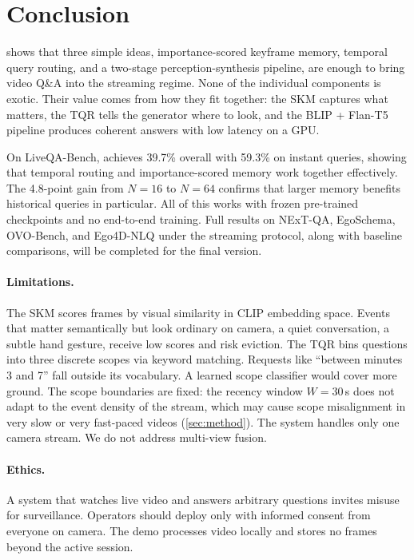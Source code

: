 \section{Conclusion}
\label{sec:conclusion}

\ours shows that three simple ideas, importance-scored keyframe memory, temporal query routing, and a two-stage perception-synthesis pipeline, are enough to bring video Q\&A into the streaming regime. None of the individual components is exotic. Their value comes from how they fit together: the SKM captures what matters, the TQR tells the generator where to look, and the BLIP + Flan-T5 pipeline produces coherent answers with low latency on a GPU.

On LiveQA-Bench, \ours achieves 39.7\% overall with 59.3\% on instant queries, showing that temporal routing and importance-scored memory work together effectively.
The 4.8-point gain from $N\!=\!16$ to $N\!=\!64$ confirms that larger memory benefits historical queries in particular.
All of this works with frozen pre-trained checkpoints and no end-to-end training.
Full results on NExT-QA, EgoSchema, OVO-Bench, and Ego4D-NLQ under the streaming protocol, along with baseline comparisons, will be completed for the final version.

\paragraph{Limitations.}
The SKM scores frames by visual similarity in CLIP embedding space. Events that matter semantically but look ordinary on camera, a quiet conversation, a subtle hand gesture, receive low scores and risk eviction.
The TQR bins questions into three discrete scopes via keyword matching. Requests like ``between minutes 3 and 7'' fall outside its vocabulary. A learned scope classifier would cover more ground.
The scope boundaries are fixed: the recency window $W\!=\!30$\,s does not adapt to the event density of the stream, which may cause scope misalignment in very slow or very fast-paced videos (\cref{sec:method}).
The system handles only one camera stream. We do not address multi-view fusion.

\paragraph{Ethics.}
A system that watches live video and answers arbitrary questions invites misuse for surveillance. Operators should deploy \ours only with informed consent from everyone on camera. The demo processes video locally and stores no frames beyond the active session.

